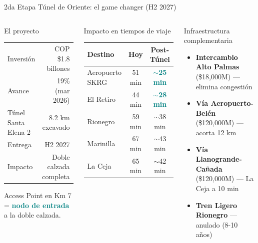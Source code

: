 \documentclass[aspectratio=169, 11pt]{beamer}
\newcommand{\highlight}[1]{\textcolor{teal}{\textbf{#1}}}
\begin{document}
{
\begin{frame}{2da Etapa Túnel de Oriente: el game changer (H2 2027)}
\begin{columns}[T]
\begin{block}{\small El proyecto}
\scriptsize
\begin{tabular}{@{}lr@{}}
Inversión & COP \$1.8 billones \\
Avance & 19\% (mar 2026) \\
Túnel Santa Elena 2 & 8.2 km excavado \\
Entrega & H2 2027 \\
Impacto & Doble calzada completa \\
\end{tabular}

\vspace{2pt}
Access Point en Km 7 = \highlight{nodo de entrada} a la doble calzada.
\end{block}

\vspace{2pt}
\begin{alertblock}{\small Impacto en tiempos de viaje}
\scriptsize
\begin{tabular}{@{}lcc@{}}
\toprule
\textbf{Destino} & \textbf{Hoy} & \textbf{Post-Túnel} \\
\midrule
\rowcolor{teal!10}
Aeropuerto SKRG & 51 min & \highlight{$\sim$25 min} \\
El Retiro & 44 min & \highlight{$\sim$28 min} \\
Rionegro & 59 min & $\sim$38 min \\
Marinilla & 67 min & $\sim$43 min \\
La Ceja & 65 min & $\sim$42 min \\
\bottomrule
\end{tabular}
\end{alertblock}

\begin{exampleblock}{\small Infraestructura complementaria}
\scriptsize
\begin{itemize}\setlength{\itemsep}{1pt}
  \item \textbf{Intercambio Alto Palmas} (\$18,000M) --- elimina congestión
  \item \textbf{Vía Aeropuerto-Belén} (\$120,000M) --- acorta 12 km
  \item \textbf{Vía Llanogrande-Cañada} (\$120,000M) --- La Ceja a 10 min
  \item \textbf{Tren Ligero Rionegro} --- anulado (8-10 años)
\end{itemize}
\end{exampleblock}


\end{columns}
\end{frame}}
\end{document}
